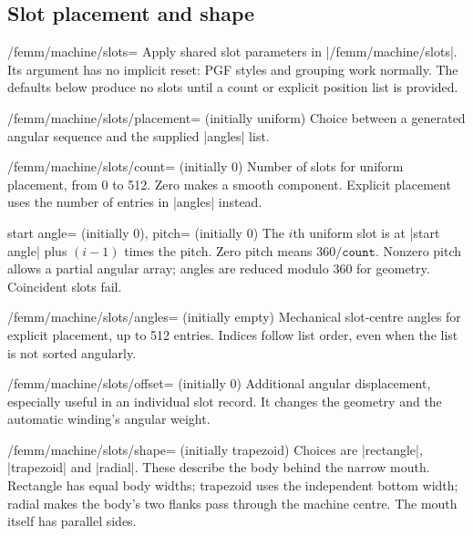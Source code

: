 \subsection{Slot placement and shape}
\begin{key}{/femm/machine/slots=}
Apply shared slot parameters in |/femm/machine/slots|. Its argument has no
implicit reset: PGF styles and grouping work normally. The defaults below
produce no slots until a count or explicit position list is provided.
\end{key}
\begin{key}{/femm/machine/slots/placement= (initially uniform)}
Choice between a generated angular sequence and the supplied |angles| list.
\end{key}
\begin{key}{/femm/machine/slots/count= (initially 0)}
Number of slots for uniform placement, from 0 to 512. Zero makes a smooth
component. Explicit placement uses the number of entries in |angles| instead.
\end{key}
\begin{keylist}{start angle= (initially 0),
 pitch= (initially 0)}
The $i$th uniform slot is at |start angle| plus $(i-1)$ times the pitch.
Zero pitch means $360/\texttt{count}$. Nonzero pitch allows a partial angular
array; angles are reduced modulo 360 for geometry. Coincident slots fail.
\end{keylist}
\begin{key}{/femm/machine/slots/angles= (initially empty)}
Mechanical slot-centre angles for explicit placement, up to 512 entries.
Indices follow list order, even when the list is not sorted angularly.
\end{key}
\begin{key}{/femm/machine/slots/offset= (initially 0)}
Additional angular displacement, especially useful in an individual slot
record. It changes the geometry and the automatic winding's angular weight.
\end{key}
\begin{key}{/femm/machine/slots/shape= (initially trapezoid)}
Choices are |rectangle|, |trapezoid| and |radial|. These describe the body
behind the narrow mouth. Rectangle has equal body widths; trapezoid uses the
independent bottom width; radial makes the body's two flanks pass through the
machine centre. The mouth itself has parallel sides.
\end{key}
